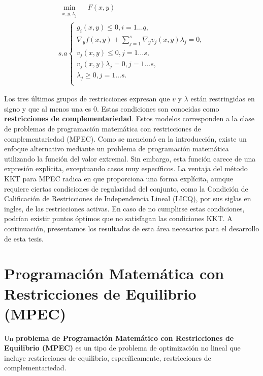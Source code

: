 % 
        \begin{equation}   
            \begin{array}{l}
                \underset{\substack{x, y, \lambda_j}}{\min} \quad F(x, y)\\
                s.a \left\{ 
                \begin{array}{l}
                    g_i(x, y) \leq 0, i=1\ldots q,\\
                    \nabla_{y} f(x, y) + \sum_{j=1}^{s} \nabla_{y} v_j(x, y) \lambda_j = 0, \\
                    v_j(x, y) \leq 0, j=1\ldots s,\\
                    v_j(x, y)\lambda_j = 0, j=1\ldots s, \\
                    \lambda_j \geq 0, j=1\ldots s.\\
                \end{array}\right.
            \end{array}
            \label{eq:KKT_Optimista}
        \end{equation}
     

Los tres últimos grupos de restricciones expresan que $v$ y $\lambda$ están restringidas en signo y que al menos una es 0. Estas condiciones son conocidas como \textbf{restricciones de complementariedad}. Estos modelos corresponden a la clase de problemas de programación matemática con restricciones de complementariedad (MPEC). 
Como se mencionó en la introducción, existe un enfoque alternativo mediante un problema de programación matemática utilizando la función del valor extremal. Sin embargo, esta función carece de una expresión explícita, exceptuando casos muy específicos. La ventaja del método KKT para MPEC radica en que proporciona una forma explícita, aunque requiere ciertas condiciones de regularidad del conjunto, como la Condición de Calificación de Restricciones de Independencia Lineal (LICQ), por sus siglas en ingles, de las restricciones activas. En caso de no cumplirse estas condiciones, podrían existir puntos óptimos que no satisfagan las condiciones KKT.
A continuación, presentamos los resultados de esta área necesarios para el desarrollo de esta tesis.

\section{Programación Matemática con Restricciones de Equilibrio (MPEC)}
Un \textbf{problema de Programación Matemático con Restricciones de Equilibrio (MPEC)} es un tipo de  problema de optimización no lineal que incluye restricciones de equilibrio, específicamente, restricciones de complementariedad.


